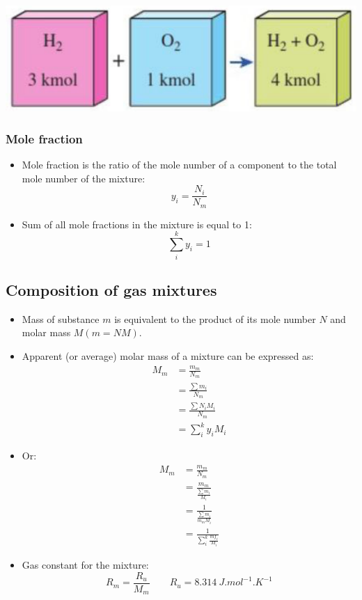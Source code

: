 \documentclass[11pt]{article}
\begin{document}
\begin{center}
\includegraphics[width=.9\linewidth]{./images/molar-analysis.png}
\end{center}
\subsubsection{Mole fraction}
\label{sec:orgb334938}
\begin{itemize}
\item Mole fraction is the ratio of the mole number of a component to the total mole number of the mixture:
\[y_i = \frac{N_i}{N_m}\]
\item Sum of all mole fractions in the mixture is equal to 1:
\[\sum_i^k y_i = 1\]
\end{itemize}
\subsection{Composition of gas mixtures}
\label{sec:org152777b}
\begin{itemize}
\item Mass of substance \(m\) is equivalent to the product of its mole number \(N\) and molar mass \(M (m = NM)\).
\item Apparent (or average) molar mass of a mixture can be expressed as:
\begin{align*}
M_m &= \frac{m_m}{N_m} \\
&= \frac{\sum m_i}{N_m} \\
&= \frac{\sum N_i M_i}{N_m} \\
&= \sum_i^k y_i M_i
\end{align*}
\item Or:
\begin{align*}
M_m &= \frac{m_m}{N_m} \\
&= \frac{m_m}{\frac{\sum m_i}{M_i}} \\
&= \frac{1}{\frac{\sum m_i}{m_m M_i}} \\
&= \frac{1}{\sum_i^k \frac{mf_i}{M_i}}
\end{align*}
\item Gas constant for the mixture:
\[R_m = \frac{R_u}{M_m} \qquad R_u = \qty{8.314}{J.mol^{-1}.K^{-1}}\]
\end{itemize}
\end{document}
